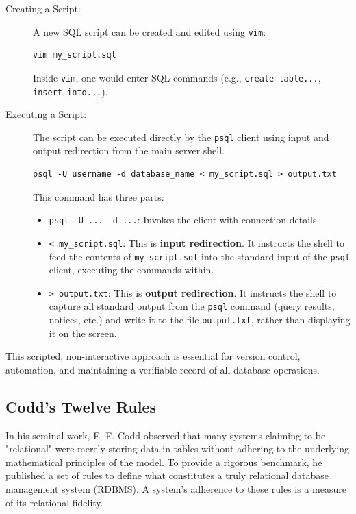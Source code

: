 \begin{description}
    \item[Creating a Script:] A new SQL script can be created and edited using \texttt{vim}:
    \begin{verbatim}
vim my_script.sql
    \end{verbatim}
    Inside \texttt{vim}, one would enter SQL commands (e.g., \texttt{create table...}, \texttt{insert into...}).

    \item[Executing a Script:] The script can be executed directly by the \texttt{psql} client using input and output redirection from the main server shell.
    \begin{verbatim}
psql -U username -d database_name < my_script.sql > output.txt
    \end{verbatim}
    This command has three parts:
    \begin{itemize}
        \item \texttt{psql -U ... -d ...}: Invokes the client with connection details.
        \item \texttt{< my\_script.sql}: This is \textbf{input redirection}. It instructs the shell to feed the contents of \texttt{my\_script.sql} into the standard input of the \texttt{psql} client, executing the commands within.
        \item \texttt{> output.txt}: This is \textbf{output redirection}. It instructs the shell to capture all standard output from the \texttt{psql} command (query results, notices, etc.) and write it to the file \texttt{output.txt}, rather than displaying it on the screen.
    \end{itemize}
\end{description}
This scripted, non-interactive approach is essential for version control, automation, and maintaining a verifiable record of all database operations.

\subsection{Codd's Twelve Rules}
In his seminal work, E. F. Codd observed that many systems claiming to be "relational" were merely storing data in tables without adhering to the underlying mathematical principles of the model. To provide a rigorous benchmark, he published a set of rules to define what constitutes a truly relational database management system (RDBMS). A system's adherence to these rules is a measure of its relational fidelity.

